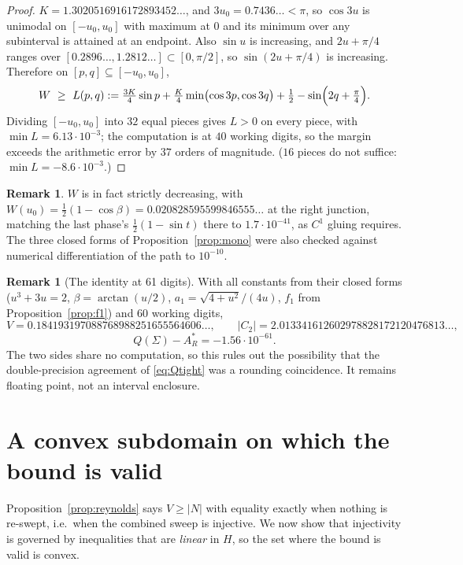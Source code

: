 \documentclass[11pt]{article}
\theoremstyle{definition}
\newtheorem{remark}[theorem]{Remark}
\newcommand{\Sig}{\Sigma}
\begin{document}
\begin{proof}
$K=1.3020516916172893452\ldots$, and $3u_0=0.7436\ldots<\pi$, so $\cos3u$ is unimodal on
$[-u_0,u_0]$ with maximum at $0$ and its minimum over any subinterval is attained at an
endpoint. Also $\sin u$ is increasing, and $2u+\pi/4$ ranges over
$[0.2896\ldots,1.2812\ldots]\subset[0,\pi/2]$, so $\sin(2u+\pi/4)$ is increasing.
Therefore on $[p,q]\subseteq[-u_0,u_0]$,
\[
  W\ \ge\ L(p,q):=\tfrac{3K}{4}\sin p+\tfrac K4\min\bigl(\cos3p,\cos3q\bigr)
       +\tfrac12-\sin\Bigl(2q+\tfrac\pi4\Bigr).
\]
Dividing $[-u_0,u_0]$ into $32$ equal pieces gives $L>0$ on every piece, with
$\min L=6.13\cdot10^{-3}$; the computation is at $40$ working digits, so the margin
exceeds the arithmetic error by $37$ orders of magnitude. ($16$ pieces do not suffice:
$\min L=-8.6\cdot10^{-3}$.)
\end{proof}

\begin{remark}
$W$ is in fact strictly decreasing, with
$W(u_0)=\tfrac12(1-\cos\beta)=0.020828595599846555\ldots$ at the right junction, matching
the last phase's $\tfrac12(1-\sin t)$ there to $1.7\cdot10^{-41}$, as $C^1$ gluing
requires. The three closed forms of Proposition~\ref{prop:mono} were also checked against
numerical differentiation of the path to $10^{-10}$.
\end{remark}

\begin{remark}[The identity at 61 digits]\label{rem:61}
With all constants from their closed forms ($u^3+3u=2$, $\beta=\arctan(u/2)$,
$a_1=\sqrt{4+u^2}/(4u)$, $f_1$ from Proposition~\ref{prop:f1}) and $60$ working digits,
\[
  V=0.184193197088768988251655564606\ldots,\qquad
  |C_2|=2.013341612602978828172120476813\ldots,
\]
\[
  Q(\Sig)-A_R^\ast=-1.56\cdot10^{-61}.
\]
The two sides share no computation, so this rules out the possibility that the
double-precision agreement of \eqref{eq:Qtight} was a rounding coincidence. It remains
floating point, not an interval enclosure.
\end{remark}

\section{A convex subdomain on which the bound is valid}\label{sec:kprime}

Proposition~\ref{prop:reynolds} says $V\ge|N|$ with equality exactly when nothing is
re-swept, i.e.\ when the combined sweep is injective. We now show that injectivity is
governed by inequalities that are \emph{linear} in $H$, so the set where the bound is
valid is convex.
\end{document}
